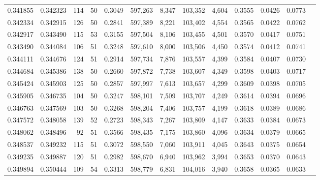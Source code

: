 \begin{tabular}{rrrrrrrrrrrrr}
0.341855 & 0.342323 &   114 &  50 &                                     0.3049 & 597,263 &   8,347 & 103,352 &   4,604 & 0.3555 & 0.0426 & 0.0773 \\
0.342334 & 0.342915 &   126 &  50 &                                     0.2841 & 597,389 &   8,221 & 103,402 &   4,554 & 0.3565 & 0.0422 & 0.0762 \\
0.342917 & 0.343490 &   115 &  53 &                                     0.3155 & 597,504 &   8,106 & 103,455 &   4,501 & 0.3570 & 0.0417 & 0.0751 \\
0.343490 & 0.344084 &   106 &  51 &                                     0.3248 & 597,610 &   8,000 & 103,506 &   4,450 & 0.3574 & 0.0412 & 0.0741 \\
0.344111 & 0.344676 &   124 &  51 &                                     0.2914 & 597,734 &   7,876 & 103,557 &   4,399 & 0.3584 & 0.0407 & 0.0730 \\
0.344684 & 0.345386 &   138 &  50 &                                     0.2660 & 597,872 &   7,738 & 103,607 &   4,349 & 0.3598 & 0.0403 & 0.0717 \\
0.345424 & 0.345903 &   125 &  50 &                                     0.2857 & 597,997 &   7,613 & 103,657 &   4,299 & 0.3609 & 0.0398 & 0.0705 \\
0.345905 & 0.346735 &   104 &  50 &                                     0.3247 & 598,101 &   7,509 & 103,707 &   4,249 & 0.3614 & 0.0394 & 0.0696 \\
0.346763 & 0.347569 &   103 &  50 &                                     0.3268 & 598,204 &   7,406 & 103,757 &   4,199 & 0.3618 & 0.0389 & 0.0686 \\
0.347572 & 0.348058 &   139 &  52 &                                     0.2723 & 598,343 &   7,267 & 103,809 &   4,147 & 0.3633 & 0.0384 & 0.0673 \\
0.348062 & 0.348496 &    92 &  51 &                                     0.3566 & 598,435 &   7,175 & 103,860 &   4,096 & 0.3634 & 0.0379 & 0.0665 \\
0.348537 & 0.349232 &   115 &  51 &                                     0.3072 & 598,550 &   7,060 & 103,911 &   4,045 & 0.3643 & 0.0375 & 0.0654 \\
0.349235 & 0.349887 &   120 &  51 &                                     0.2982 & 598,670 &   6,940 & 103,962 &   3,994 & 0.3653 & 0.0370 & 0.0643 \\
0.349894 & 0.350444 &   109 &  54 &                                     0.3313 & 598,779 &   6,831 & 104,016 &   3,940 & 0.3658 & 0.0365 & 0.0633 \\

\end{tabular}
